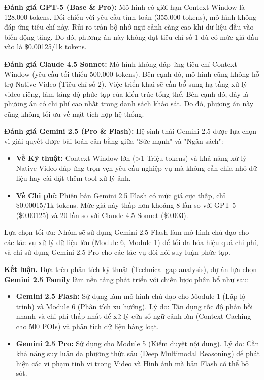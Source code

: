 \textbf{Đánh giá GPT-5 (Base \& Pro):} Mô hình có giới hạn Context Window là 128.000 tokens. Đối chiếu với yêu cầu tính toán (355.000 tokens), mô hình không đáp ứng tiêu chí này. Rủi ro tràn bộ nhớ ngữ cảnh càng cao khi dữ liệu đầu vào biến động tăng. Do đó, phương án này không đạt tiêu chí số 1 dù có mức giá đầu vào là \$0.00125/1k tokens.

\textbf{Đánh giá Claude 4.5 Sonnet:} Mô hình không đáp ứng tiêu chí Context Window (yêu cầu tối thiểu 500.000 tokens). Bên cạnh đó, mô hình cũng không hỗ trợ Native Video (Tiêu chí số 2). Việc triển khai sẽ cần bổ sung hạ tầng xử lý video riêng, làm tăng độ phức tạp của kiến trúc tổng thể. Bên cạnh đó, đây là phương án có chi phí cao nhất trong danh sách khảo sát. Do đó, phương án này cũng không tối ưu về mặt tích hợp hệ thống.

\textbf{Đánh giá Gemini 2.5 (Pro \& Flash):} Hệ sinh thái Gemini 2.5 được lựa chọn vì giải quyết được bài toán cân bằng giữa "Sức mạnh" và "Ngân sách":

\begin{itemize}
    \item \textbf{Về Kỹ thuật:} Context Window lớn (>1 Triệu tokens) và khả năng xử lý Native Video đáp ứng trọn vẹn yêu cầu nghiệp vụ mà không cần chia nhỏ dữ liệu hay cài đặt thêm tool xử lý ảnh.
    \item \textbf{Về Chi phí:} Phiên bản Gemini 2.5 Flash có mức giá cực thấp, chỉ \$0.00015/1k tokens. Mức giá này thấp hơn khoảng 8 lần so với GPT-5 (\$0.00125) và 20 lần so với Claude 4.5 Sonnet (\$0.003).
\end{itemize}

Lựa chọn tối ưu: Nhóm sẽ sử dụng Gemini 2.5 Flash làm mô hình chủ đạo cho các tác vụ xử lý dữ liệu lớn (Module 6, Module 1) để tối đa hóa hiệu quả chi phí, và chỉ sử dụng Gemini 2.5 Pro cho các tác vụ đòi hỏi suy luận phức tạp.

\textbf{Kết luận.} Dựa trên phân tích kỹ thuật (Technical gap analysis), dự án lựa chọn \textbf{Gemini 2.5 Family} làm nền tảng phát triển với chiến lược phân bổ như sau:

\begin{itemize}
    \item \textbf{Gemini 2.5 Flash:} Sử dụng làm mô hình chủ đạo cho Module 1 (Lập lộ trình) và Module 6 (Phân tích xu hướng). Lý do: Tận dụng tốc độ phản hồi nhanh và chi phí thấp nhất để xử lý cửa sổ ngữ cảnh lớn (Context Caching cho 500 POIs) và phân tích dữ liệu hàng loạt.
    
    \item \textbf{Gemini 2.5 Pro:} Sử dụng cho Module 5 (Kiểm duyệt nội dung). Lý do: Cần khả năng suy luận đa phương thức sâu (Deep Multimodal Reasoning) để phát hiện các vi phạm tinh vi trong Video và Hình ảnh mà bản Flash có thể bỏ sót.
\end{itemize}

